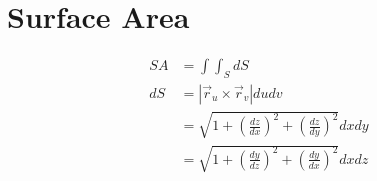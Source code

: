 \section{Surface Area}

  \begin{align}
    SA
      &= \int \int_{S} dS \\
    dS
      &= \left| \vec{r}_{u} \times \vec{r}_{v} \right| du dv \\
      &= \sqrt{1 + \left( \frac{dz}{dx} \right)^{2} + \left( \frac{dz}{dy} \right)^{2}} dx dy \\
      &= \sqrt{1 + \left( \frac{dy}{dz} \right)^{2} + \left( \frac{dy}{dx} \right)^{2}} dx dz
  \end{align}